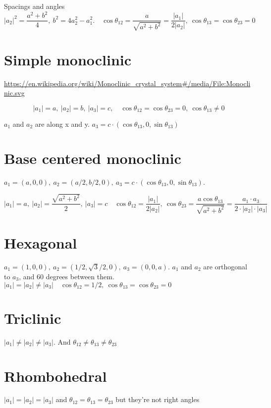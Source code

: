 \documentclass[a4paper,10pt]{article} 	%
\numberwithin{equation}{section}
\begin{document}
	Spacings and angles
	\begin{equation}\label{key}
	|a_2|^2 = \frac{a^2+b^2}{4}, \ b^2 = 4a_2^2-a_1^2. \quad \cos \theta_{12} = \frac{a}{\sqrt{a^2+b^2}} = \frac{|a_1|}{2|a_2|}, \ \cos\theta_{13} = \cos \theta_{23} = 0
	\end{equation}
	
	\section{Simple monoclinic}
	\url{https://en.wikipedia.org/wiki/Monoclinic_crystal_system#/media/File:Monoclinic.svg}

	\begin{equation}\label{key}
		|a_1| = a,\ |a_2| = b,\ |a_3| = c, \quad \cos \theta_{12} = \cos \theta_{23} = 0, \ \cos \theta_{13} \neq 0
	\end{equation}
	
	$a_1$ and $a_2$ are along x and y. $a_3 = c \cdot (\cos \theta_{13},0,\sin \theta_{13})$
	
	\section{Base centered monoclinic}
	$ a_1 = (a,0,0),\ a_2 =(a/2, b/2,0),\ a_3 = c \cdot (\cos \theta_{13},0,\sin \theta_{13}) $.
	
	\begin{equation}\label{key}
	|a_1| = a,\ |a_2| = \frac{\sqrt{a^2+b^2}}{2}, \ |a_3| = c \quad \cos \theta_{12} = \frac{|a_1|}{2|a_2|}, \ \cos \theta_{23} = \frac{a\cos\theta_{13}}{\sqrt{a^2+b^2}} = \frac{a_1 \cdot a_3}{2 \cdot |a_2| \cdot |a_3|}
	\end{equation}
	
	
	\section{Hexagonal}
	$ a_1 = (1,0,0),\ a_2 = (1/2,\sqrt{3}/2,0),\ a_3 = (0,0,a) $. $a_1$ and $a_2$ are orthogonal to $a_3$, and 60 degrees between them.
	$|a_1| = |a_2| \neq |a_3| \quad \cos \theta_{12} = 1/2, \ \cos \theta_{13} = \cos \theta_{23} = 0$
	
	\section{Triclinic}
	$|a_1| \neq |a_2| \neq |a_3|$. And $\theta_{12} \neq \theta_{13} \neq \theta_{23}$
	
	\section{Rhombohedral}
	$|a_1| = |a_2| = |a_3|$ and $\theta_{12} = \theta_{13} = \theta_{23}$ but they're not right angles
\end{document}
